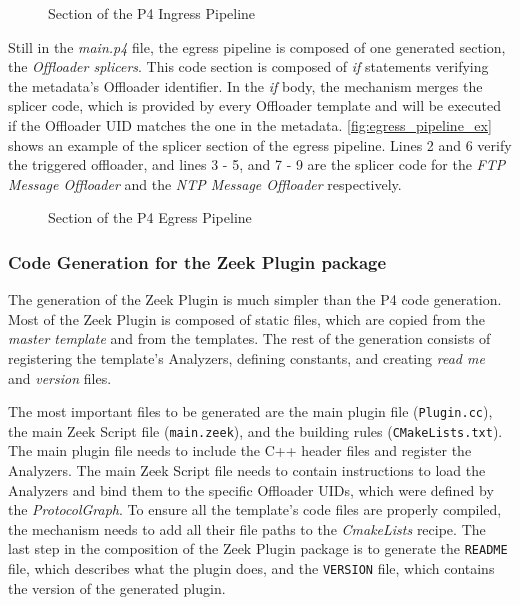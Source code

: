 \begin{figure}[htb]
    \caption{Section of the P4 Ingress Pipeline}
    \begin{center}
        
    \end{center}
    \label{fig:ingress_pipeline_ex}
\end{figure}

Still in the \textit{main.p4} file, the egress pipeline is composed of one generated section, the \textit{Offloader splicers}. This code section is composed of \textit{if} statements verifying the metadata's Offloader identifier. In the \textit{if} body, the mechanism merges the splicer code, which is provided by every Offloader template and will be executed if the Offloader UID matches the one in the metadata. \autoref{fig:egress_pipeline_ex} shows an example of the splicer section of the egress pipeline. Lines 2 and 6 verify the triggered offloader, and lines 3 - 5, and 7 - 9 are the splicer code for the \textit{FTP Message Offloader} and the \textit{NTP Message Offloader} respectively.

\begin{figure}[htb]
    \caption{Section of the P4 Egress Pipeline}
    \begin{center}
        
    \end{center}
    \label{fig:egress_pipeline_ex}
\end{figure}

\subsubsection*{Code Generation for the Zeek Plugin package}

The generation of the Zeek Plugin is much simpler than the P4 code generation. Most of the Zeek Plugin is composed of static files, which are copied from the \textit{master template} and from the templates. The rest of the generation consists of registering the template's Analyzers, defining constants, and creating \textit{read me} and \textit{version} files.

The most important files to be generated are the main plugin file (\texttt{Plugin.cc}), the main Zeek Script file (\texttt{main.zeek}), and the building rules (\texttt{CMakeLists.txt}). The main plugin file needs to include the C++ header files and register the Analyzers. The main Zeek Script file needs to contain instructions to load the Analyzers and bind them to the specific Offloader UIDs, which were defined by the \textit{ProtocolGraph}. To ensure all the template's code files are properly compiled, the mechanism needs to add all their file paths to the \textit{CmakeLists} recipe. The last step in the composition of the Zeek Plugin package is to generate the \texttt{README} file, which describes what the plugin does, and the \texttt{VERSION} file, which contains the version of the generated plugin.

